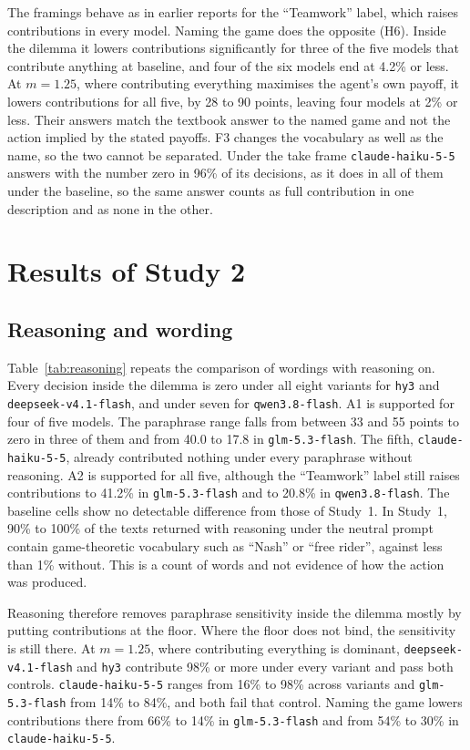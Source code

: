 \documentclass[runningheads]{llncs}
\begin{document}
The framings behave as in earlier reports for the ``Teamwork'' label, which raises contributions in every model. Naming the game does the opposite (H6). Inside the dilemma it lowers contributions significantly for three of the five models that contribute anything at baseline, and four of the six models end at 4.2\% or less. At $m=1.25$, where contributing everything maximises the agent's own payoff, it lowers contributions for all five, by 28 to 90 points, leaving four models at 2\% or less. Their answers match the textbook answer to the named game and not the action implied by the stated payoffs. F3 changes the vocabulary as well as the name, so the two cannot be separated. Under the take frame \texttt{claude-haiku-5-5} answers with the number zero in 96\% of its decisions, as it does in all of them under the baseline, so the same answer counts as full contribution in one description and as none in the other.

\section{Results of Study 2}

\subsection{Reasoning and wording}

{\sloppy Table~\ref{tab:reasoning} repeats the comparison of wordings with reasoning on. Every decision inside the dilemma is zero under all eight variants for \texttt{hy3} and \texttt{deepseek-v4.1-flash}, and under seven for \texttt{qwen3.8-flash}. A1 is supported for four of five models. The paraphrase range falls from between 33 and 55 points to zero in three of them and from 40.0 to 17.8 in \texttt{glm-5.3-flash}. The fifth, \texttt{claude-haiku-5-5}, already contributed nothing under every paraphrase without reasoning. A2 is supported for all five, although the ``Teamwork'' label still raises contributions to 41.2\% in \texttt{glm-5.3-flash} and to 20.8\% in \texttt{qwen3.8-flash}. The baseline cells show no detectable difference from those of Study~1. In Study~1, 90\% to 100\% of the texts returned with reasoning under the neutral prompt contain game-theoretic vocabulary such as ``Nash'' or ``free rider'', against less than 1\% without. This is a count of words and not evidence of how the action was produced.\par}

Reasoning therefore removes paraphrase sensitivity inside the dilemma mostly by putting contributions at the floor. Where the floor does not bind, the sensitivity is still there. At $m=1.25$, where contributing everything is dominant, \texttt{deepseek-v4.1-flash} and \texttt{hy3} contribute 98\% or more under every variant and pass both controls. \texttt{claude-haiku-5-5} ranges from 16\% to 98\% across variants and \texttt{glm-5.3-flash} from 14\% to 84\%, and both fail that control. Naming the game lowers contributions there from 66\% to 14\% in \texttt{glm-5.3-flash} and from 54\% to 30\% in \texttt{claude-haiku-5-5}.
\end{document}
